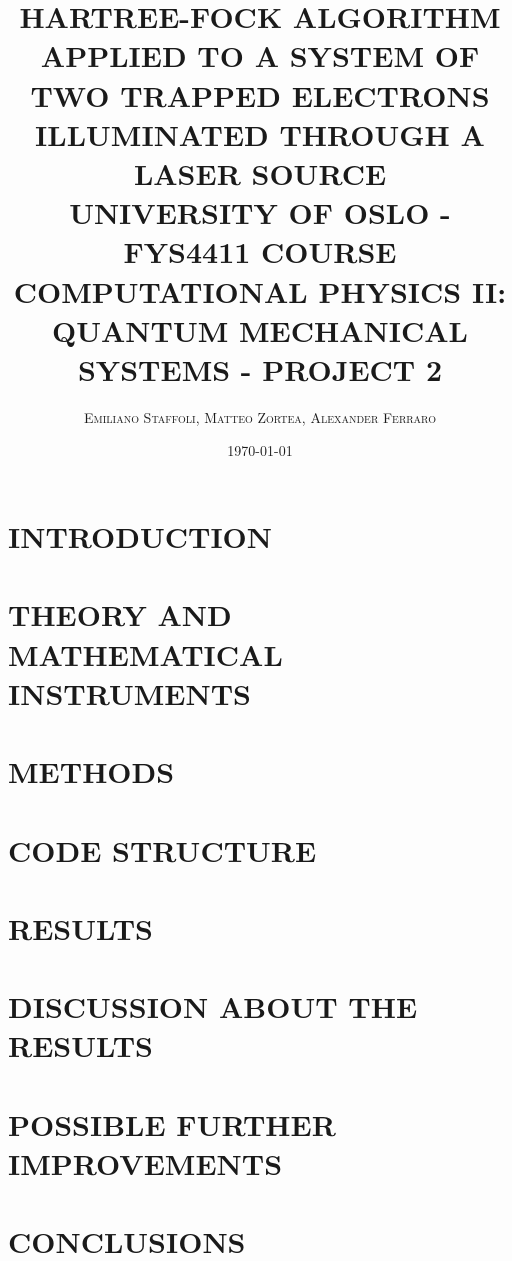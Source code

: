 \documentclass[a4paper, twocolumn]{article}
\title{\LARGE HARTREE-FOCK ALGORITHM APPLIED TO A SYSTEM OF TWO TRAPPED ELECTRONS ILLUMINATED THROUGH A LASER SOURCE \\ \vspace{4mm}  \large UNIVERSITY OF OSLO - FYS4411 COURSE \\ \large COMPUTATIONAL PHYSICS II: QUANTUM MECHANICAL SYSTEMS - PROJECT 2 }
\author{\textsc{Emiliano Staffoli, Matteo Zortea, Alexander Ferraro} }
\date{\today}
\begin{document}
\setcounter{page}{1}

\twocolumn[{
\maketitle

\vspace{12mm}
}]


\section{INTRODUCTION}
\label{sec:introduction}
   


\section{THEORY AND MATHEMATICAL INSTRUMENTS}
\label{sec:theory}
    
   
\section{METHODS}
\label{sec:methods}
    
    
\section{CODE STRUCTURE}
\label{sec:code}



\section{RESULTS}
\label{sec:results}


\section{DISCUSSION ABOUT THE RESULTS}
\label{sec:discussion}


\section{POSSIBLE FURTHER IMPROVEMENTS}
\label{sec:improvements}


\section{CONCLUSIONS}
\label{sec:conclusions}

\end{document}
